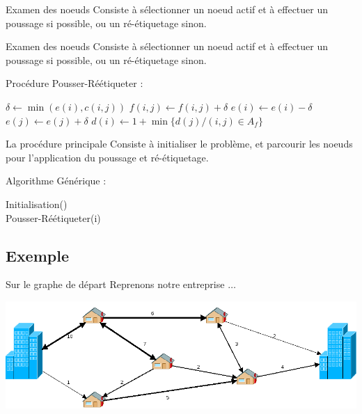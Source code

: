 \documentclass[hyperref={},
xcolor={dvipsnames,svgnames,table},10pt]{beamer}
\begin{document}
\begin{frame}{Examen des noeuds}
	Consiste à sélectionner un noeud actif et à effectuer un poussage si possible, ou un ré-étiquetage
	sinon. \vfill
\end{frame}

\begin{frame}{Examen des noeuds}
	Consiste à sélectionner un noeud actif et à effectuer un poussage si possible, ou un ré-étiquetage
	sinon. \vfill

	Procédure Pousser-Réétiqueter :
	\begin{algorithmic}[1]
				\STATE $\delta \leftarrow \min(e(i), c(i,j))$
				\STATE $f(i,j) \leftarrow f(i,j) + \delta$
				\STATE $e(i) \leftarrow e(i) - \delta$
				\STATE $e(j) \leftarrow e(j) + \delta$
			\ELSE
				\STATE $d(i) \leftarrow 1 + \min\{ d(j) / (i,j) \in A_f\}$
			\ENDIF
		\ENDIF
	\end{algorithmic}\vfill
\end{frame}

\begin{frame}{La procédure principale}
	Consiste à initialiser le problème, et parcourir les noeuds pour l'application du poussage et
	ré-étiquetage.\vfill

	Algorithme Générique :
	\begin{algorithmic}[1]
			\STATE Initialisation() \\
				\STATE Pousser-Réétiqueter(i) 
			\ENDWHILE
	\end{algorithmic}\vfill
\end{frame}

\subsection{Exemple}

\begin{frame}{Sur le graphe de départ}
	Reprenons notre entreprise $\dots$\vfill
	\begin{center}
		\includegraphics[scale=0.32]{img/exemple.png}
	\end{center}
\end{frame}
\end{document}
